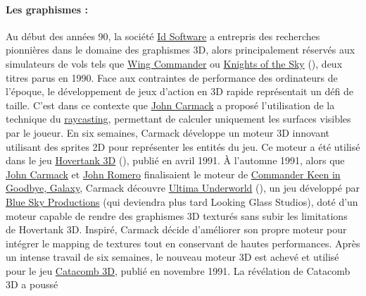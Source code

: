 \documentclass[12pt]{report}
\begin{document}
\paragraph{Les graphismes :}
Au début des années 90, la société \href{https://fr.wikipedia.org/wiki/Id_Software}{Id Software}\cite{Id_Software} a entrepris des 
recherches pionnières dans le domaine des graphismes 3D, alors principalement réservés aux simulateurs de vols tels 
que \href{https://fr.wikipedia.org/wiki/Wing_Commander_(jeu_vid%C3%A9o)}{Wing Commander}\cite{Wing_Commander} ou 
\href{https://en.wikipedia.org/wiki/Knights_of_the_Sky}{Knights of the Sky}\cite{Knights_of_the_Sky} (), deux titres parus en 1990. Face aux 
contraintes de performance des ordinateurs de l'époque, le développement de jeux d'action en 3D rapide représentait 
un défi de taille. C'est dans ce contexte que \href{https://fr.wikipedia.org/wiki/John_Carmack}{John Carmack}\cite{John_Carmack} a 
proposé l'utilisation de la technique du \href{https://fr.wikipedia.org/wiki/Raycasting}{raycasting}\cite{Raycasting}, permettant 
de calculer uniquement les surfaces visibles par le joueur. En six semaines, Carmack développe un moteur 3D innovant 
utilisant des sprites 2D pour représenter les entités du jeu. Ce moteur a été utilisé dans le jeu 
\href{https://fr.wikipedia.org/wiki/Hovertank_3D}{Hovertank 3D}\cite{Hovertank3D} (), publié en avril 1991.
À l'automne 1991, alors que \href{https://fr.wikipedia.org/wiki/John_Carmack}{John Carmack}\cite{John_Carmack} et 
\href{https://fr.wikipedia.org/wiki/John_Romero}{John Romero}\cite{John_Romero} finalisaient le moteur de 
\href{https://en.wikipedia.org/wiki/Commander_Keen_in_Goodbye,_Galaxy}{Commander Keen in Goodbye, Galaxy}\cite{Commander_Keen_in_Goodbye_Galaxy}, Carmack 
découvre \href{https://fr.wikipedia.org/wiki/Ultima_Underworld}{Ultima Underworld}\cite{Ultima_Underworld} (), un jeu développé par 
\href{https://fr.wikipedia.org/wiki/Looking_Glass_Studios}{Blue Sky Productions}\cite{Looking_Glass_Studios} (qui deviendra plus tard Looking Glass Studios), 
doté d'un moteur capable de rendre des graphismes 3D texturés sans subir les limitations de Hovertank 3D.
Inspiré, Carmack décide d'améliorer son propre moteur pour 
intégrer le mapping de textures tout en conservant de hautes performances. Après un intense travail de six semaines, 
le nouveau moteur 3D est achevé et utilisé pour le jeu \href{https://fr.wikipedia.org/wiki/Catacomb_3D}{Catacomb 3D}\cite{Catacomb3D},
publié en novembre 1991. La révélation de Catacomb 3D a poussé 
\end{document}

